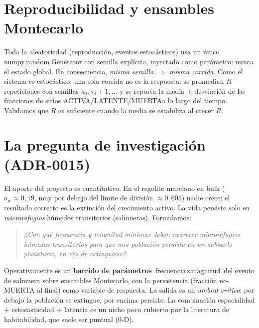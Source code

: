 \documentclass[11pt]{article}
\newcommand{\MUERTA}{\textcolor{acmuerta}{\textsf{MUERTA}}}
\newcommand{\LATENTE}{\textcolor{aclatente}{\textsf{LATENTE}}}
\newcommand{\ACTIVA}{\textcolor{acactiva}{\textsf{ACTIVA}}}
\begin{document}
\section{Reproducibilidad y ensambles Montecarlo}

Toda la aleatoriedad (reproducción, eventos estocásticos) usa un único
\textsf{numpy.random.Generator} con semilla explícita, inyectado como parámetro:
nunca el estado global. En consecuencia, \emph{misma semilla $\Rightarrow$ misma
corrida}. Como el sistema es estocástico, una sola corrida no es la respuesta: se
promedian $R$ repeticiones con semillas $s_0,s_0{+}1,\dots$ y se reporta la
media $\pm$ desviación de las fracciones de sitios \ACTIVA/\LATENTE/\MUERTA a lo
largo del tiempo. Validamos que $R$ es suficiente cuando la media se estabiliza al
crecer $R$.

\section{La pregunta de investigación (ADR-0015)}

El aporte del proyecto es cuantitativo. En el regolito marciano en bulk
($a_w\approx 0{,}19$, muy por debajo del límite de división $\approx 0{,}605$)
nadie crece: el resultado correcto es la extinción del crecimiento activo. La vida
persiste solo en \emph{microrefugios} húmedos transitorios (salmueras). Formulamos:

\begin{quote}\itshape
¿Con qué frecuencia y magnitud mínimas deben aparecer microrefugios húmedos
transitorios para que una población persista en un subsuelo planetario, en vez de
extinguirse?
\end{quote}

Operativamente es un \textbf{barrido de parámetros} $\text{frecuencia}\times
\text{magnitud}$ del evento de salmuera sobre ensambles Montecarlo, con la
persistencia (fracción no-\MUERTA{} al final) como variable de respuesta. La salida
es un \emph{umbral crítico}: por debajo la población se extingue, por encima
persiste. La combinación espacialidad $+$ estocasticidad $+$ latencia es un nicho
poco cubierto por la literatura de habitabilidad, que suele ser puntual (0-D).
\end{document}
